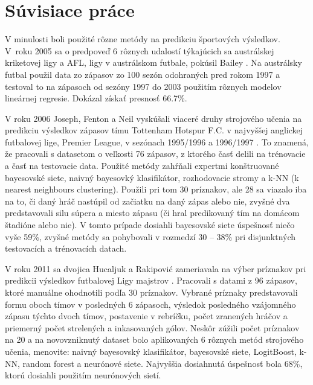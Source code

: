 \section*{Súvisiace práce}

V minulosti boli použité rôzne metódy na predikciu športových výsledkov.
V~roku 2005 sa o predpoveď 6 rôznych udalostí týkajúcich sa austrálskej kriketovej ligy a AFL, ligy v austrálskom futbale, pokúsil Bailey \citep{related:bailey}. 
Na austrálsky futbal použil data zo zápasov zo 100 sezón odohraných pred rokom 1997 a testoval to na zápasoch od sezóny 1997 do 2003 použitím rôznych modelov lineárnej regresie. 
Dokázal získať presnosť 66.7\%.

V roku 2006 Joseph, Fenton a Neil vyskúšali viaceré druhy strojového učenia na predikciu výsledkov zápasov tímu Tottenham Hotspur F.C. v najvyššej anglickej futbalovej lige, Premier League, v sezónach 1995/1996 a 1996/1997 \citep{related:joseph}.
To znamená, že pracovali s datasetom o veľkosti 76 zápasov, z ktorého časť delili na trénovacie a časť na testovacie data. 
Použité metódy zahŕňali expertmi konštruované bayesovské siete, naivný bayesovký klasifikátor, rozhodovacie stromy a k-NN (k nearest neighbours clustering). 
Použili pri tom 30 príznakov, ale 28 sa viazalo iba na to, či daný hráč nastúpil od začiatku na daný zápas alebo nie, zvyšné dva predstavovali silu súpera a miesto zápasu (či hral predikovaný tím na domácom štadióne alebo nie).
V tomto prípade dosiahli bayesovské siete úspešnosť niečo vyše 59\%, zvyšné metódy sa pohybovali v rozmedzí 30 -- 38\% pri disjunktných testovacích a trénovacích datach.

V roku 2011 sa dvojica Hucaljuk a Rakipovi{\'c} zameriavala na výber príznakov pri predikcii výsledkov futbalovej Ligy majstrov \citep{related:hucaljuk}. 
Pracovali s datami z 96 zápasov, ktoré manuálne ohodnotili podľa 30 príznakov.
Vybrané príznaky predstavovali formu oboch tímov v posledných 6 zápasoch, výsledok posledného vzájomného zápasu týchto dvoch tímov, postavenie v rebríčku, počet zranených hráčov a priemerný počet strelených a inkasovaných gólov.
Neskôr zúžili počet príznakov na 20 a na novovzniknutý dataset bolo aplikovaných 6 rôznych metód strojového učenia, menovite: naivný bayesovský klasifikátor, bayesovské siete, LogitBoost, k-NN, random forest a neurónové siete. Najvyššia dosiahnutá úspešnosť bola 68\%, ktorú dosiahli použitím neurónových sietí.

